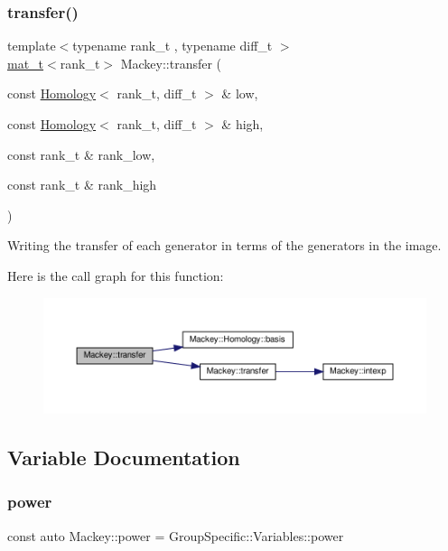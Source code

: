 \subsubsection{\texorpdfstring{transfer()}{transfer()}\hspace{0.1cm}{\footnotesize\ttfamily [6/6]}}
{\footnotesize\ttfamily template$<$typename rank\+\_\+t , typename diff\+\_\+t $>$ \\
\hyperlink{namespaceMackey_a035386035757dade630f685e508e5cf9}{mat\+\_\+t}$<$rank\+\_\+t$>$ Mackey\+::transfer (\begin{DoxyParamCaption}\item[{const \hyperlink{classMackey_1_1Homology}{Homology}$<$ rank\+\_\+t, diff\+\_\+t $>$ \&}]{low,  }\item[{const \hyperlink{classMackey_1_1Homology}{Homology}$<$ rank\+\_\+t, diff\+\_\+t $>$ \&}]{high,  }\item[{const rank\+\_\+t \&}]{rank\+\_\+low,  }\item[{const rank\+\_\+t \&}]{rank\+\_\+high }\end{DoxyParamCaption})}



Writing the transfer of each generator in terms of the generators in the image. 

Here is the call graph for this function\+:\nopagebreak
\begin{figure}[H]
\begin{center}
\leavevmode
\includegraphics[width=350pt]{namespaceMackey_abd5b370902e8b53b32e3fd4e329f068d_cgraph}
\end{center}
\end{figure}


\subsection{Variable Documentation}
\mbox{\label{namespaceMackey_aafdaaabd06dd9ceefe6fa4f26d13a60d}} 
\subsubsection{\texorpdfstring{power}{power}}
{\footnotesize\ttfamily const auto Mackey\+::power = Group\+Specific\+::\+Variables\+::power}



